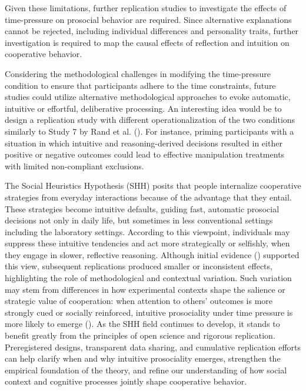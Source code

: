 \documentclass[
  letterpaper,
]{book}
\begin{document}
Given these limitations, further replication studies to investigate the
effects of time-pressure on prosocial behavior are required. Since
alternative explanations cannot be rejected, including individual
differences and personality traits, further investigation is required to
map the causal effects of reflection and intuition on cooperative
behavior.

Considering the methodological challenges in modifying the time-pressure
condition to ensure that participants adhere to the time constraints,
future studies could utilize alternative methodological approaches to
evoke automatic, intuitive or effortful, deliberative processing. An
interesting idea would be to design a replication study with different
operationalization of the two conditions similarly to Study 7 by Rand et
al. (). For instance, priming
participants with a situation in which intuitive and reasoning-derived
decisions resulted in either positive or negative outcomes could lead to
effective manipulation treatments with limited non-compliant exclusions.

The Social Heuristics Hypothesis (SHH) posits that people internalize
cooperative strategies from everyday interactions because of the
advantage that they entail. These strategies become intuitive defaults,
guiding fast, automatic prosocial decisions not only in daily life, but
sometimes in less conventional settings including the laboratory
settings. According to this viewpoint, individuals may suppress these
intuitive tendencies and act more strategically or selfishly, when they
engage in slower, reflective reasoning. Although initial evidence
() supported this
view, subsequent replications produced smaller or inconsistent effects,
highlighting the role of methodological and contextual variation. Such
variation may stem from differences in how experimental contexts shape
the salience or strategic value of cooperation: when attention to
others' outcomes is more strongly cued or socially reinforced, intuitive
prosociality under time pressure is more likely to emerge
(). As the SHH
field continues to develop, it stands to benefit greatly from the
principles of open science and rigorous replication. Preregistered
designs, transparent data sharing, and cumulative replication efforts
can help clarify when and why intuitive prosociality emerges, strengthen
the empirical foundation of the theory, and refine our understanding of
how social context and cognitive processes jointly shape cooperative
behavior.
\end{document}
